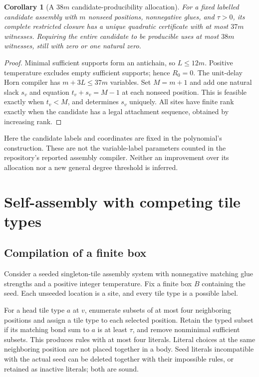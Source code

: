 \documentclass[11pt,letterpaper]{article}
\newtheorem{corollary}[theorem]{Corollary}
\theoremstyle{definition}
\theoremstyle{remark}
\begin{document}
\begin{corollary}[A $38m$ candidate-producibility allocation]\label{qoc:ts:cor:38}
For a fixed labelled candidate assembly with $m$ nonseed positions,
nonnegative glues, and $\tau>0$, its complete restricted closure has a
unique quadratic certificate with at most $37m$ witnesses. Requiring the
entire candidate to be producible uses at most $38m$ witnesses, still with
zero or one natural zero.
\end{corollary}
\begin{proof}
Minimal sufficient supports form an antichain, so $L\le12m$. Positive
temperature excludes empty sufficient supports; hence $R_0=0$. The
unit-delay Horn compiler has $m+3L\le37m$ variables. Set $M=m+1$ and
add one natural slack $s_v$ and equation $t_v+s_v=M-1$ at each nonseed
position. This is feasible exactly when $t_v<M$, and determines $s_v$
uniquely. All sites have finite rank exactly when the candidate has a
legal attachment sequence, obtained by increasing rank.
\end{proof}

Here the candidate labels and coordinates are fixed in the polynomial's
construction. These are not the variable-label parameters counted in the
repository's reported assembly compiler. Neither an improvement over its
allocation nor a new general degree threshold is inferred.

\section{Self-assembly with competing tile types}\label{qoc:ts:sec:selfassembly}
\subsection{Compilation of a finite box}
Consider a seeded singleton-tile assembly system with nonnegative matching
glue strengths and a positive integer temperature. Fix a finite box $B$
containing the seed. Each unseeded location is a site, and every tile type
is a possible label.

For a head tile type $a$ at $v$, enumerate subsets of at most four neighboring
positions and assign a tile type to each selected position. Retain the
typed subset if its matching bond sum to $a$ is at least $\tau$, and remove
nonminimal sufficient subsets. This produces rules with at most four
literals. Literal choices at the same neighboring position are not placed
together in a body. Seed literals incompatible with the actual seed can
be deleted together with their impossible rules, or retained as inactive
literals; both are sound.
\end{document}
